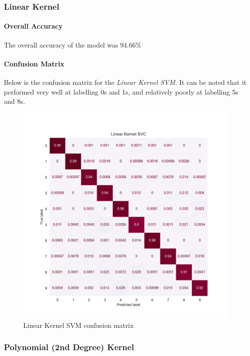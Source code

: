 \subsubsection{Linear Kernel}

\paragraph{Overall Accuracy} The overall accuracy of the model was $94.66\%$

\paragraph{Confusion Matrix} Below is the confusion matrix for the \textit{Linear Kernel SVM}. It can be noted that it performed very well at labelling 0s and 1s, and relatively poorly at labelling 5s and 8s.

\begin{figure}[h]
    \centering
    \includegraphics[scale=0.65]{images/exp-results/svm/svc_linear_conf-matrix.png}
    \caption{Linear Kernel SVM confusion matrix}
    \label{fig:exp_res_lin_svm_conf_mat}
\end{figure}

\subsubsection{Polynomial (2nd Degree) Kernel}

